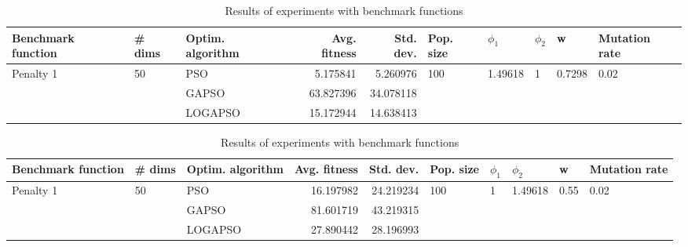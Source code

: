 \documentclass{article}
\begin{document}
\begin{table}
\centering
\caption{Results of experiments with benchmark functions}
\begin{tabular}{lllrrlllll}
\toprule
        Benchmark function &             \# dims & Optim. algorithm &  Avg. fitness &  Std. dev. &            Pop. size &               $\phi_{1}$ &         $\phi_{2}$ &                       w &         Mutation rate \\
\midrule
\multirow{3}{*}{Penalty 1} & \multirow{3}{*}{50} &              PSO &      5.175841 &   5.260976 & \multirow{3}{*}{100} & \multirow{3}{*}{1.49618} & \multirow{3}{*}{1} & \multirow{3}{*}{0.7298} & \multirow{3}{*}{0.02} \\
                           &                     &            GAPSO &     63.827396 &  34.078118 &                      &                          &                    &                         &                       \\
                           &                     &          LOGAPSO &     15.172944 &  14.638413 &                      &                          &                    &                         &                       \\
\bottomrule
\end{tabular}
\end{table}
\begin{table}
\centering
\caption{Results of experiments with benchmark functions}
\begin{tabular}{lllrrlllll}
\toprule
        Benchmark function &             \# dims & Optim. algorithm &  Avg. fitness &  Std. dev. &            Pop. size &         $\phi_{1}$ &               $\phi_{2}$ &                     w &         Mutation rate \\
\midrule
\multirow{3}{*}{Penalty 1} & \multirow{3}{*}{50} &              PSO &     16.197982 &  24.219234 & \multirow{3}{*}{100} & \multirow{3}{*}{1} & \multirow{3}{*}{1.49618} & \multirow{3}{*}{0.55} & \multirow{3}{*}{0.02} \\
                           &                     &            GAPSO &     81.601719 &  43.219315 &                      &                    &                          &                       &                       \\
                           &                     &          LOGAPSO &     27.890442 &  28.196993 &                      &                    &                          &                       &                       \\
\bottomrule
\end{tabular}
\end{table}
\end{document}
